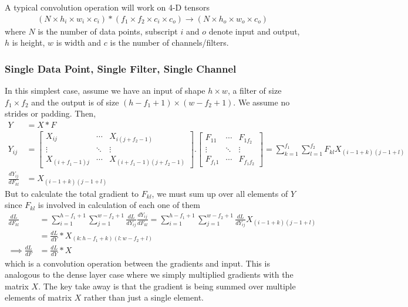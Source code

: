 \documentclass[../../deep_learning_notes.tex]{subfiles}
\begin{document}
A typical convolution operation will work on 4-D tensors
\begin{align*}
    (N \times h_{i} \times w_{i} \times c_{i}) * (f_{1} \times f_{2} \times c_{i} \times c_{o}) \rightarrow (N \times h_{o} \times w_{o} \times c_{o})
\end{align*}
where $N$ is the number of data points, subscript $i$ and $o$ denote input and output, $h$ is height, $w$ is width and $c$ is the number of channels/filters.


\subsubsection{Single Data Point, Single Filter, Single Channel}
In this simplest case, assume we have an input of shape $h \times w$, a filter of size $f_{1} \times f_{2}$ and the output is of size $(h - f_{1} + 1) \times (w - f_{2} + 1)$. We assume no strides or padding. Then,
\begin{align*}
    Y &= X * F\\
    Y_{ij} &= \begin{bmatrix}
        X_{ij} &\cdots &X_{i(j + f_{2}-1)}\\
        \vdots &\ddots &\vdots\\
        X_{(i+f_{1}-1)j} &\cdots &X_{(i+f_{1}-1)(j+f_{2}-1)}
    \end{bmatrix}.
    \begin{bmatrix}
        F_{11} &\cdots &F_{1f_{2}}\\
        \vdots &\ddots &\vdots\\
        F_{f_{1}1} &\cdots &F_{f_{1}f_{2}}
    \end{bmatrix}
    = \sum_{k=1}^{f_{1}} \sum_{l=1}^{f_{2}} F_{kl} X_{(i-1+k)(j-1+l)}\\
    \frac{dY_{ij}}{dF_{kl}} &= X_{(i-1+k)(j-1+l)}
\end{align*}
But to calculate the total gradient to $F_{kl}$, we must sum up over all elements of $Y$ since $F_{kl}$ is involved in calculation of each one of them
\begin{align*}
    \frac{dL}{dF_{kl}} &= \sum_{i=1}^{h - f_{1} + 1} \sum_{j=1}^{w - f_{2} + 1} \frac{dL}{dY_{ij}} \frac{dY_{ij}}{dF_{kl}}
    = \sum_{i=1}^{h - f_{1} + 1} \sum_{j=1}^{w - f_{2} + 1} \frac{dL}{dY_{ij}} X_{(i-1+k)(j-1+l)}\\
    &= \frac{dL}{dY} * X_{(k:h-f_{1}+k)(l:w-f_{2}+l)}\\
    \implies \frac{dL}{dF} &= \frac{dL}{dY} * X
\end{align*}
which is a convolution operation between the gradients and input. This is analogous to the dense layer case where we simply multiplied gradients with the matrix $X$. The key take away is that the gradient is being summed over multiple elements of matrix $X$ rather than just a single element.\newline
\end{document}
